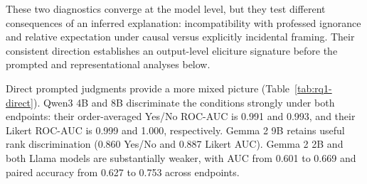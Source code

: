 \begin{table}[t]
\centering
\scriptsize
{}
\caption{Behavioral eliciture diagnostics on 150 matched critical--control pairs. Log-probability differences are mean within-pair critical-minus-control differences; CI values are symmetric half-widths of the 95\% pair-bootstrap intervals. Ignorance uses summed continuation surprisal; explicit happenstance uses the mean factor-token log-probability advantage after \emph{because} versus \emph{and it so happened that}.}
\label{tab:rq1-behavior}
\end{table}

These two diagnostics converge at the model level, but they test different consequences of an inferred explanation: incompatibility with professed ignorance and relative expectation under causal versus explicitly incidental framing. Their consistent direction establishes an output-level eliciture signature before the prompted and representational analyses below.

Direct prompted judgments provide a more mixed picture (Table~\ref{tab:rq1-direct}). Qwen3 4B and 8B discriminate the conditions strongly under both endpoints: their order-averaged Yes/No ROC-AUC is 0.991 and 0.993, and their Likert ROC-AUC is 0.999 and 1.000, respectively. Gemma 2 9B retains useful rank discrimination (0.860 Yes/No and 0.887 Likert AUC). Gemma 2 2B and both Llama models are substantially weaker, with AUC from 0.601 to 0.669 and paired accuracy from 0.627 to 0.753 across endpoints.

